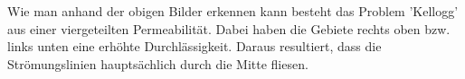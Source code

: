 \documentclass[12pt,a4paper]{scrartcl}
\numberwithin{equation}{section}
\begin{document}
\begin{enumerate}[label=(\roman*)]
\begin{figure}[H]
	\centering
\end{figure}

Wie man anhand der obigen Bilder erkennen kann besteht das Problem 'Kellogg' aus einer viergeteilten Permeabilität.
Dabei haben die Gebiete rechts oben bzw. links unten eine erhöhte Durchlässigkeit.
Daraus resultiert, dass die Strömungslinien hauptsächlich durch die Mitte fliesen.

\begin{figure}[H]
	\centering


\end{figure}
\end{enumerate}
\end{document}
